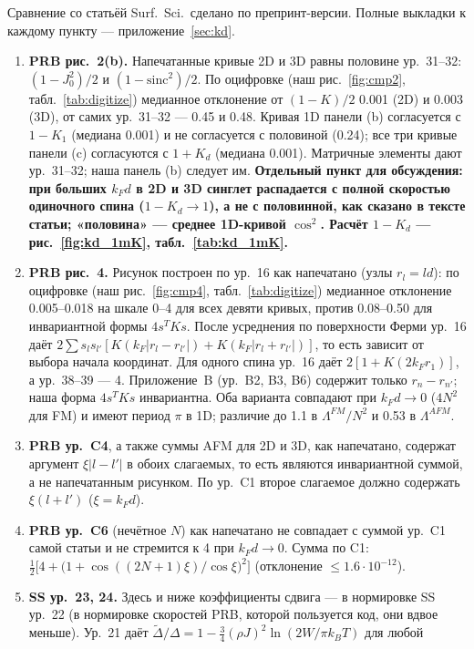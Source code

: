 \documentclass[12pt,a4paper]{article}
\newcommand{\rhoJ}{\rho J}
\newcommand{\kT}{k_BT}
\begin{document}
Сравнение со статьёй Surf.\ Sci.\ сделано по препринт-версии. Полные выкладки к каждому пункту --- приложение~\ref{sec:kd}.

\begin{enumerate}[label=(\roman*)]
\item \textbf{PRB рис.~2(b).} Напечатанные кривые 2D и 3D равны половине ур.~31--32:
$(1-J_0^2)/2$ и $(1-\mathrm{sinc}^2)/2$. По оцифровке (наш рис.~\ref{fig:cmp2}, табл.~\ref{tab:digitize})
медианное отклонение от $(1-K)/2$ 0.001 (2D) и 0.003 (3D), от самих ур.~31--32 --- 0.45 и 0.48. Кривая 1D
панели (b) согласуется с $1-K_1$ (медиана 0.001) и не согласуется с половиной (0.24); все три кривые панели (c)
согласуются с $1+K_d$ (медиана 0.001). Матричные элементы дают ур.~31--32; наша панель (b) следует им.
\textbf{Отдельный пункт для обсуждения: при больших $k_Fd$ в 2D и 3D синглет распадается с полной
скоростью одиночного спина ($1-K_d\to1$), а не с половинной, как сказано в тексте статьи; «половина» ---
среднее 1D-кривой $\cos^2$. Расчёт $1-K_d$ --- рис.~\ref{fig:kd_1mK}, табл.~\ref{tab:kd_1mK}.}
\item \textbf{PRB рис.~4.} Рисунок построен по ур.~16 как напечатано (узлы $r_l=ld$): по оцифровке
(наш рис.~\ref{fig:cmp4}, табл.~\ref{tab:digitize}) медианное отклонение 0.005--0.018 на шкале 0--4 для
всех девяти кривых, против 0.08--0.50 для инвариантной формы $4s^TKs$. После усреднения по поверхности
Ферми ур.~16 даёт
$2\sum s_ls_{l'}[K(k_F|r_l-r_{l'}|)+K(k_F|r_l+r_{l'}|)]$, то есть зависит от выбора начала координат.
Для одного спина ур.~16 даёт $2[1+K(2k_Fr_1)]$, а ур.~38--39 --- 4. Приложение~B (ур.~B2, B3, B6)
содержит только $r_n-r_{n'}$; наша форма $4s^TKs$ инвариантна. Оба варианта совпадают при
$k_Fd\to0$ ($4N^2$ для FM) и имеют период $\pi$ в 1D; различие до 1.1 в $\Lambda^{FM}/N^2$ и 0.53 в $\Lambda^{AFM}$.
\item \textbf{PRB ур.~C4}, а также суммы AFM для 2D и 3D, как напечатано, содержат аргумент
$\xi|l-l'|$ в обоих слагаемых, то есть являются инвариантной суммой, а не напечатанным рисунком. По
ур.~C1 второе слагаемое должно содержать $\xi(l+l')$ ($\xi=k_Fd$).
\item \textbf{PRB ур.~C6} (нечётное $N$) как напечатано не совпадает с суммой ур.~C1 самой статьи и не
стремится к 4 при $k_Fd\to0$. Сумма по C1:
$\tfrac12\big[4+\big(1+\cos((2N+1)\xi)/\cos\xi\big)^2\big]$ (отклонение $\le1.6\cdot10^{-12}$).
\item \textbf{SS ур.~23, 24.} Здесь и ниже коэффициенты сдвига --- в нормировке SS ур.~22 (в нормировке
скоростей PRB, которой пользуется код, они вдвое меньше). Ур.~21 даёт $\tilde\Delta/\Delta=1-\tfrac34(\rhoJ)^2\ln(2W/\pi\kT)$ для любой

\end{enumerate}
\end{document}
